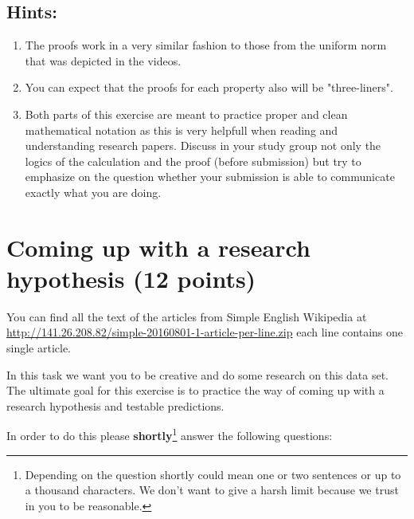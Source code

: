\documentclass{WeSTassignment}
\begin{document}
\subsection{Hints:}
\begin{enumerate}
\item The proofs work in a very similar fashion to those from the uniform norm that was depicted in the videos. 

\item You can expect that the proofs for each property also will be "three-liners".

\item Both parts of this exercise are meant to practice proper and clean mathematical notation as this is very helpfull when reading and understanding research papers. Discuss in your study group not only the logics of the calculation and the proof (before submission) but try to emphasize on the question whether your submission is able to communicate exactly what you are doing. 

\end{enumerate}



\section{Coming up with a research hypothesis (12 points)}
You can find all the text of the articles from Simple English Wikipedia at \url{http://141.26.208.82/simple-20160801-1-article-per-line.zip} each line contains one single article. 

In this task we want you to be creative and do some research on this data set. The ultimate goal for this exercise is to practice the way of coming up with a research hypothesis and testable predictions. 

In order to do this please \textbf{shortly}\footnote{Depending on the question shortly could mean one or two sentences or up to a thousand characters. We don't want to give a harsh limit because we trust in you to be reasonable.} answer the following questions: 
\end{document}
